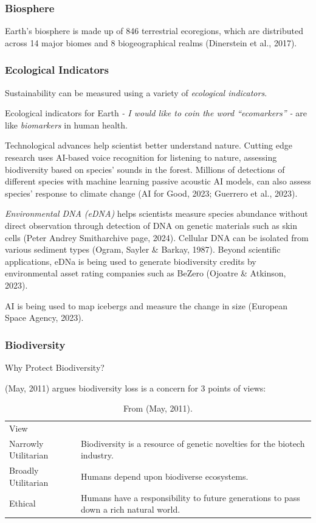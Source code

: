 \documentclass[
  letterpaper,
  DIV=11,
  numbers=noendperiod]{scrartcl}
\begin{document}
\subsubsection{Biosphere}\label{biosphere}

Earth's biosphere is made up of 846 terrestrial ecoregions, which are
distributed across 14 major biomes and 8 biogeographical realms
(Dinerstein et al., 2017).

\subsubsection{Ecological Indicators}\label{ecological-indicators}

Sustainability can be measured using a variety of \emph{ecological
indicators}.

Ecological indicators for Earth \emph{- I would like to coin the word
``ecomarkers'' -} are like \emph{biomarkers} in human health.

Technological advances help scientist better understand nature. Cutting
edge research uses AI-based voice recognition for listening to nature,
assessing biodiversity based on species' sounds in the forest. Millions
of detections of different species with machine learning passive
acoustic AI models, can also assess species' response to climate change
(AI for Good, 2023; Guerrero et al., 2023).

\emph{Environmental DNA (eDNA)} helps scientists measure species
abundance without direct observation through detection of DNA on genetic
materials such as skin cells (Peter Andrey Smitharchive page, 2024).
Cellular DNA can be isolated from various sediment types (Ogram, Sayler
\& Barkay, 1987). Beyond scientific applications, eDNa is being used to
generate biodiversity credits by environmental asset rating companies
such as BeZero (Ojoatre \& Atkinson, 2023).

AI is being used to map icebergs and measure the change in size
(European Space Agency, 2023).

\subsubsection{Biodiversity}\label{biodiversity}

Why Protect Biodiversity?

(May, 2011) argues biodiversity loss is a concern for 3 points of views:

\begin{longtable}[]{@{}
  >{\raggedright\arraybackslash}p{}
  >{\raggedright\arraybackslash}p{}@{}}
\caption{From (May, 2011).}\tabularnewline
\toprule\noalign{}
\endfirsthead
\endhead
\bottomrule\noalign{}
\endlastfoot
View & \\
Narrowly Utilitarian & Biodiversity is a resource of genetic novelties
for the biotech industry. \\
Broadly Utilitarian & Humans depend upon biodiverse ecosystems. \\
Ethical & Humans have a responsibility to future generations to pass
down a rich natural world. \\
\end{longtable}
\end{document}
